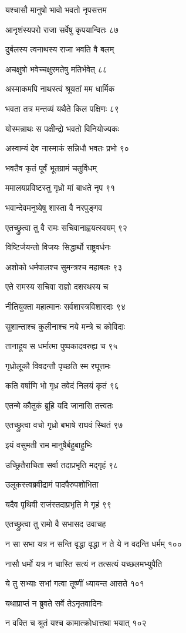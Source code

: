 यश्चासौ मानुषो भावो भवतो नृपसत्तम

आनृशंस्यपरो राजा सर्वेषु कृपयान्वितः ८७

दुर्बलस्य त्वनाथस्य राजा भवति वै बलम्

अचक्षुषो भवेच्चक्षुरमतेषु मतिर्भवेत् ८८

अस्माकमपि नाथस्त्वं श्रूयतां मम धार्मिक

भवता तत्र मन्तव्यं यथैते किल पक्षिणः ८९

योस्मन्नाथः स पक्षीन्द्रो भवतो विनियोज्यकः

अस्वाम्यं देव नास्माकं सन्निधौ भवतः प्रभो ९०

भवतैव कृतं पूर्वं भूतग्रामं चतुर्विधम्

ममालयप्रविष्टस्तु गृध्रो मां बाधते नृप ९१

भवान्देवमनुष्येषु शास्ता वै नरपुङ्गव

एतच्छ्रुत्वा तु वै रामः सचिवानाह्वयत्स्वयम् ९२

विष्टिर्जयन्तो विजयः सिद्धार्थो राष्ट्रवर्धनः

अशोको धर्मपालश्च सुमन्त्रश्च महाबलः ९३

एते रामस्य सचिवा राज्ञो दशरथस्य च

नीतियुक्ता महात्मानः सर्वशास्त्रविशारदाः ९४

सुशान्ताश्च कुलीनाश्च नये मन्त्रे च कोविदाः

तानाहूय स धर्मात्मा पुष्पकादवरुह्य च ९५

गृध्रोलूकौ विवदन्तौ पृच्छति स्म रघूत्तमः

कति वर्षाणि भो गृध्र तवेदं निलयं कृतं ९६

एतन्मे कौतुकं ब्रूहि यदि जानासि तत्त्वतः

एतच्छ्रुत्वा वचो गृध्रो बभाषे राघवं स्थितं ९७

इयं वसुमती राम मानुषैर्बहुबाहुभिः

उच्छ्रितैराचिता सर्वा तदाप्रभृति मद्गृहं ९८

उलूकस्त्वब्रवीद्रामं पादपैरुपशोभिता

यदैव पृथिवी राजंस्तदाप्रभृति मे गृहं ९९

एतच्छ्रुत्वा तु रामो वै सभासद उवाचह

न सा सभा यत्र न सन्ति वृद्धा वृद्धा न ते ये न वदन्ति धर्मम् १००

नासौ धर्मो यत्र न चास्ति सत्यं न तत्सत्यं यच्छलमभ्युपैति

ये तु सभ्याः सभां गत्वा तूष्णीं ध्यायन्त आसते १०१

यथाप्राप्तं न ब्रुवते सर्वे तेऽनृतवादिनः

न वक्ति च श्रुतं यश्च कामात्क्रोधात्तथा भयात् १०२


